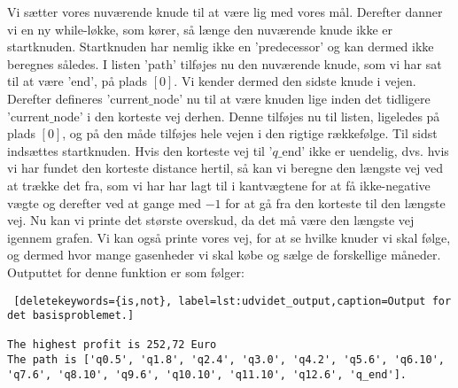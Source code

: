 Vi sætter vores nuværende knude til at være lig med vores mål.
Derefter danner vi en ny while-løkke, som kører, så længe den nuværende knude ikke er startknuden. Startknuden har nemlig ikke en 'predecessor' og kan dermed ikke beregnes således. I listen 'path' tilføjes nu den nuværende knude, som vi har sat til at være 'end', på plads $[0]$. Vi kender dermed den sidste knude i vejen. Derefter defineres 'current$\_$node' nu til at være knuden lige inden det tidligere 'current$\_$node' i den korteste vej derhen. Denne tilføjes nu til listen, ligeledes på plads $[0]$, og på den måde tilføjes hele vejen i den rigtige rækkefølge. Til sidst indsættes startknuden.
Hvis den korteste vej til '$q\_$end' ikke er uendelig, dvs. hvis vi har fundet den korteste distance hertil, så kan vi beregne den længste vej ved at trække det fra, som vi har har lagt til i kantvægtene for at få ikke-negative vægte og derefter ved at gange med $-1$ for at gå fra den korteste til den længste vej. 
Nu kan vi printe det største overskud, da det må være den længste vej igennem grafen. Vi kan også printe vores vej, for at se hvilke knuder vi skal følge, og dermed hvor mange gasenheder vi skal købe og sælge de forskellige måneder.
Outputtet for denne funktion er som følger:


 

\begin{lstlisting} [deletekeywords={is,not}, label=lst:udvidet_output,caption=Output for det basisproblemet.]

The highest profit is 252,72 Euro
The path is ['q0.5', 'q1.8', 'q2.4', 'q3.0', 'q4.2', 'q5.6', 'q6.10', 'q7.6', 'q8.10', 'q9.6', 'q10.10', 'q11.10', 'q12.6', 'q_end'].

\end{lstlisting}
